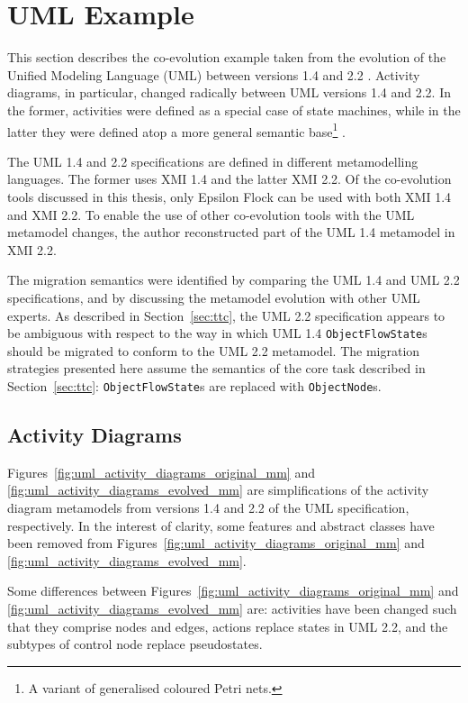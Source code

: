 \section{UML Example}
This section describes the co-evolution example taken from the evolution of the Unified Modeling Language (UML) between versions 1.4 \cite{uml14} and 2.2 \cite{uml22}. Activity diagrams, in particular, changed radically between UML versions 1.4 and 2.2. In the former, activities were defined as a special case of state machines, while in the latter they were defined atop a more general semantic base\footnote{A variant of generalised coloured Petri nets.} \cite{selic05uml2}.

The UML 1.4 and 2.2 specifications are defined in different metamodelling languages. The former uses XMI 1.4 and the latter XMI 2.2. Of the co-evolution tools discussed in this thesis, only Epsilon Flock can be used with both XMI 1.4 and XMI 2.2. To enable the use of other co-evolution tools with the UML metamodel changes, the author reconstructed part of the UML 1.4 metamodel in XMI 2.2.

The migration semantics were identified by comparing the UML 1.4 and UML 2.2 specifications, and by discussing the metamodel evolution with other UML experts. As described in Section~\ref{sec:ttc}, the UML 2.2 specification appears to be ambiguous with respect to the way in which UML 1.4 \texttt{ObjectFlowState}s should be migrated to conform to the UML 2.2 metamodel. The migration strategies presented here assume the semantics of the core task described in Section~\ref{sec:ttc}: \texttt{ObjectFlowState}s are replaced with \texttt{ObjectNode}s.

\subsection{Activity Diagrams}
\label{subsec:uml_activity_diagrams}
Figures~\ref{fig:uml_activity_diagrams_original_mm} and \ref{fig:uml_activity_diagrams_evolved_mm} are simplifications of the activity diagram metamodels from versions 1.4 and 2.2 of the UML specification, respectively. In the interest of clarity, some features and abstract classes have been removed from Figures~\ref{fig:uml_activity_diagrams_original_mm} and \ref{fig:uml_activity_diagrams_evolved_mm}.


Some differences between Figures~\ref{fig:uml_activity_diagrams_original_mm} and \ref{fig:uml_activity_diagrams_evolved_mm} are: activities have been changed such that they comprise nodes and edges, actions replace states in UML 2.2, and the subtypes of control node replace pseudostates.

